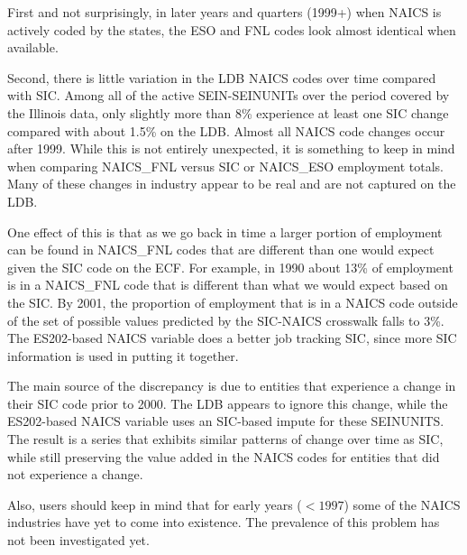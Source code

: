 First and not surprisingly, in
later years and quarters (1999+) when NAICS is actively coded by the
states, the ESO and FNL codes look almost identical when available.

Second, there is little variation in the LDB NAICS codes over time compared 
with SIC. Among all of the active SEIN-SEINUNITs over the period covered by
the Illinois data, 
only slightly more than  8{\%} experience at least one SIC change compared with about 1.5{\%} on 
the LDB. Almost all NAICS code changes occur after 1999. While this is not entirely 
unexpected, it is something to keep in mind when comparing NAICS{\_}FNL 
versus SIC or NAICS{\_}ESO employment totals. Many of these changes in 
industry appear to be real and are not captured on the LDB.

One effect of this is that as we go back in time a larger portion of 
employment can be found in NAICS{\_}FNL codes that are different than one 
would expect given the SIC code on the ECF. For example, in 1990 about 
13{\%} of employment is in a NAICS{\_}FNL code that is different than what 
we would expect based on the SIC. By 2001, the proportion of employment
that is in a NAICS code outside of the set of possible values predicted by
the SIC-NAICS crosswalk falls to 3{\%}. The 
ES202-based NAICS variable does a better job tracking SIC, since more SIC 
information is used in putting it together.

The main source of the discrepancy is due to entities that experience a 
change in their SIC code prior to 2000. The LDB appears to ignore this 
change, while the ES202-based NAICS variable uses an SIC-based impute for these 
SEINUNITS. The result is a series that exhibits similar patterns of change 
over time as SIC, while still preserving the value added in the NAICS codes 
for entities that did not experience a change.

Also, users should keep in mind that for early years ($<1997$) some of the 
NAICS industries have yet to come into existence. The
prevalence of this problem has not been investigated yet.


